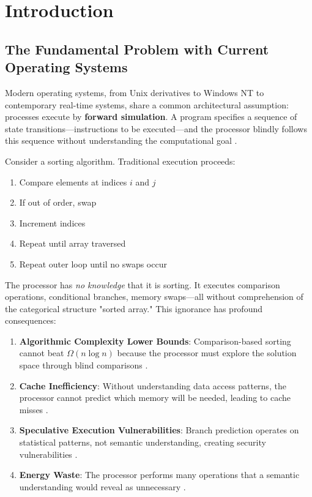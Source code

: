 \documentclass[twocolumn,10pt]{article}
\theoremstyle{definition}
\theoremstyle{remark}
\begin{document}
\tableofcontents

\section{Introduction}
\label{sec:introduction}

\subsection{The Fundamental Problem with Current Operating Systems}

Modern operating systems, from Unix derivatives to Windows NT to contemporary real-time systems, share a common architectural assumption: processes execute by \textbf{forward simulation}. A program specifies a sequence of state transitions—instructions to be executed—and the processor blindly follows this sequence without understanding the computational goal \citep{tanenbaum2014modern,silberschatz2018operating}.

Consider a sorting algorithm. Traditional execution proceeds:
\begin{enumerate}
    \item Compare elements at indices $i$ and $j$
    \item If out of order, swap
    \item Increment indices
    \item Repeat until array traversed
    \item Repeat outer loop until no swaps occur
\end{enumerate}

The processor has \emph{no knowledge} that it is sorting. It executes comparison operations, conditional branches, memory swaps—all without comprehension of the categorical structure "sorted array." This ignorance has profound consequences:

\begin{enumerate}
    \item \textbf{Algorithmic Complexity Lower Bounds}: Comparison-based sorting cannot beat $\Omega(n \log n)$ because the processor must explore the solution space through blind comparisons \citep{cormen2009introduction}.

    \item \textbf{Cache Inefficiency}: Without understanding data access patterns, the processor cannot predict which memory will be needed, leading to cache misses \citep{hennessy2011computer}.

    \item \textbf{Speculative Execution Vulnerabilities}: Branch prediction operates on statistical patterns, not semantic understanding, creating security vulnerabilities \citep{kocher2019spectre}.

    \item \textbf{Energy Waste}: The processor performs many operations that a semantic understanding would reveal as unnecessary \citep{mudge2001power}.
\end{enumerate}
\end{document}

